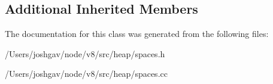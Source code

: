 \subsection*{Additional Inherited Members}


The documentation for this class was generated from the following files\+:\begin{DoxyCompactItemize}
\item 
/\+Users/joshgav/node/v8/src/heap/spaces.\+h\item 
/\+Users/joshgav/node/v8/src/heap/spaces.\+cc\end{DoxyCompactItemize}
